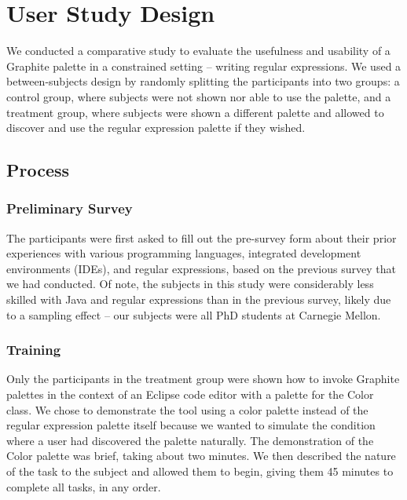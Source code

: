 \documentclass[10pt, conference, compsocconf]{IEEEtran}
\begin{document}


\section{User Study Design}

We conducted a comparative study to evaluate the usefulness and usability of a Graphite palette in a constrained setting -- writing regular expressions. We used a between-subjects design by randomly splitting the participants into two groups: a control group, where subjects were not shown nor able to use the palette, and a treatment group, where subjects were shown a different palette and allowed to discover and use the regular expression palette if they wished.

\subsection{Process}
\subsubsection{Preliminary Survey}
The participants were first asked to fill out the pre-survey form about their prior experiences with various programming languages, integrated development environments (IDEs), and regular expressions, based on the previous survey that we had conducted. Of note, the subjects in this study were considerably less skilled with Java and regular expressions than in the previous survey, likely due to a sampling effect -- our subjects were all PhD students at Carnegie Mellon.

\subsubsection{Training}
Only the participants in the treatment group were shown how to invoke Graphite palettes in the context of an  Eclipse code editor with a palette for the Color class. We chose to demonstrate the tool using a color palette instead of the regular expression palette itself because we wanted to simulate the condition where a user had discovered the palette naturally. The demonstration of the Color palette was brief, taking about two minutes.
We then described the nature of the task to the subject and allowed them to begin, giving them 45 minutes to complete all tasks, in any order.
\end{document}

